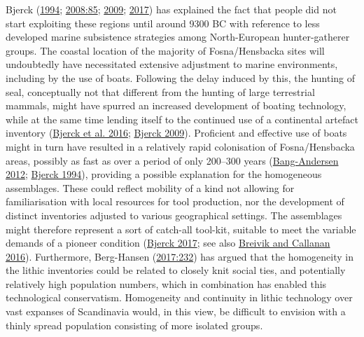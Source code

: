 \documentclass[
  12pt,
  a4paper,
  oneside]{book}
\begin{document}
Bjerck (\protect\hyperlink{ref-bjerck1994}{1994}; \protect\hyperlink{ref-bjerck2008}{2008:85}; \protect\hyperlink{ref-bjerck2009}{2009}; \protect\hyperlink{ref-bjerck2017}{2017}) has explained the fact that people did not start exploiting these regions until around 9300 BC with reference to less developed marine subsistence strategies among North-European hunter-gatherer groups. The coastal location of the majority of Fosna/Hensbacka sites will undoubtedly have necessitated extensive adjustment to marine environments, including by the use of boats. Following the delay induced by this, the hunting of seal, conceptually not that different from the hunting of large terrestrial mammals, might have spurred an increased development of boating technology, while at the same time lending itself to the continued use of a continental artefact inventory (\protect\hyperlink{ref-bjerck2016}{Bjerck et al. 2016}; \protect\hyperlink{ref-bjerck2009}{Bjerck 2009}). Proficient and effective use of boats might in turn have resulted in a relatively rapid colonisation of Fosna/Hensbacka areas, possibly as fast as over a period of only 200--300 years (\protect\hyperlink{ref-bang-andersen2012}{Bang-Andersen 2012}; \protect\hyperlink{ref-bjerck1994}{Bjerck 1994}), providing a possible explanation for the homogeneous assemblages. These could reflect mobility of a kind not allowing for familiarisation with local resources for tool production, nor the development of distinct inventories adjusted to various geographical settings. The assemblages might therefore represent a sort of catch-all tool-kit, suitable to meet the variable demands of a \textquotesingle pioneer condition\textquotesingle{} (\protect\hyperlink{ref-bjerck2017}{Bjerck 2017}; see also \protect\hyperlink{ref-breivik2016}{Breivik and Callanan 2016}). Furthermore, Berg-Hansen (\protect\hyperlink{ref-berg-hansen2017}{2017:232}) has argued that the homogeneity in the lithic inventories could be related to closely knit social ties, and potentially relatively high population numbers, which in combination has enabled this technological conservatism. Homogeneity and continuity in lithic technology over vast expanses of Scandinavia would, in this view, be difficult to envision with a thinly spread population consisting of more isolated groups.
\end{document}
